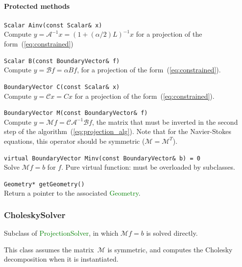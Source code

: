 \documentclass[11pt]{article}
\def\class#1{\textcolor{green}{\ttfamily\small #1}} %
\let\code\lstinline
\begin{document}
\paragraph{Protected methods}
\begin{description}
	\item \code|Scalar Ainv(const Scalar& x)|\\
		Compute $y = \mathcal{A}^{-1}x=(1+(\alpha/2)L)^{-1}x$ for a projection of the form~(\ref{eq:constrained})
	\item \code|Scalar B(const BoundaryVector& f)|\\
		Compute $y = \mathcal{B}f=\alpha Bf$, for a projection of the form~(\ref{eq:constrained}).
	\item \code|BoundaryVector C(const Scalar& x)|\\
		Compute $y = \mathcal{C}x=Cx$ for a projection of the form~(\ref{eq:constrained}).
	\item \code|BoundaryVector M(const BoundaryVector& f)|\\
		Compute $y = \mathcal{M}f=\mathcal{C}\mathcal{A}^{-1}\mathcal{B}f$, the matrix that must be inverted in the second step of the algorithm~(\ref{eq:projection_alg}).  Note that for the Navier-Stokes equations, this operator should be symmetric ($\mathcal{M}=\mathcal{M}^T$).
	\item \code|virtual BoundaryVector Minv(const BoundaryVector& b) = 0|\\
		Solve $\mathcal{M}f=b$ for $f$.  Pure virtual function: must be overloaded by subclasses.
	\item \code|Geometry* getGeometry()|\\
		Return a pointer to the associated \class{Geometry}.
\end{description}

\subsubsection{CholeskySolver}
Subclass of \class{ProjectionSolver}, in which $\mathcal{M}f=b$ is solved directly.

This class assumes the matrix~$\mathcal{M}$ is symmetric, and computes the Cholesky decomposition when it is instantiated.
\end{document}
